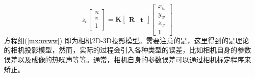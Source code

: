   \begin{equation}\label{mx:uvww}
    z_{c}\begin{bmatrix}
      u\\
      v\\
     1
     \end{bmatrix}
     =\mathbf{K}
     \begin{bmatrix}
      \mathbf{R}&\mathbf{t}
     \end{bmatrix}
     \begin{bmatrix}
      x_{w}\\
      y_{w}\\
     z_{w}\\
     1
     \end{bmatrix}
  \end{equation}
  方程组(\ref{mx:uvww}) 即为相机2D-3D投影模型。需要注意的是，这里得到的是理论的相机投影模型，然而，实际的过程会引入各种类型的误差，比如相机自身的参数误差以及成像的热噪声等等。通常，相机自身的参数误差可以通过相机标定程序来矫正。


